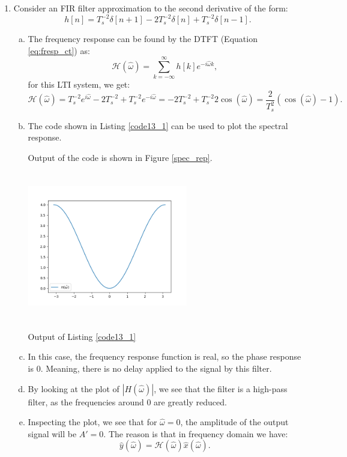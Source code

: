 \begin{enumerate}
\item Consider an FIR filter approximation to the second derivative of the form:
$$h[n]=T_{s}^{-2}\delta[n+1]-2T_{s}^{-2}\delta[n]+T_{s}^{-2}\delta[n-1].$$

\begin{enumerate}[a)]
\item The frequency response can be found by the DTFT (Equation \ref{eq:fresp_ct}) as:
$$\mathcal{H}(\hat{\omega})=\sum_{k=-\infty}^{\infty}h[k]e^{-i\hat{\omega}k},$$
for this LTI system, we get:
$$\mathcal{H}(\hat{\omega})=T_{s}^{-2}e^{i\hat{\omega}}-2T_{s}^{-2}+T_{s}^{-2}e^{-i\hat{\omega}}=-2T_{s}^{-2}+T_{s}^{-2}2\cos(\hat{\omega})=\frac{2}{T_{s}^{2}}(\cos(\hat{\omega})-1).$$

\item The code shown in Listing \ref{code13_1} can be used to plot the spectral response. 


Output of the code is shown in Figure \ref{spec_rep}.
\begin{marginfigure}
    \includegraphics[width=7.0cm,height=6.5cm]{ch11/figures/freq13.png}
    \caption{Output of Listing \ref{code13_1}}
    \label{spec_rep}
\end{marginfigure}

\item In this case, the frequency response function is real, so the phase response is $0$. Meaning, there is no delay applied to the signal by this filter.

\item By looking at the plot of $|H(\hat{\omega})|$, we see that the filter is a high-pass filter, as the frequencies around $0$ are greatly reduced. 

\item Inspecting the plot, we see that for $\hat{\omega}=0$, the amplitude of the output signal will be $A'=0$. The reason is that in frequency domain we have:
$$\hat{y}(\hat{\omega})=\mathcal{H}(\hat{\omega})\hat{x}(\hat{\omega}).$$


\end{enumerate}
\end{enumerate}
